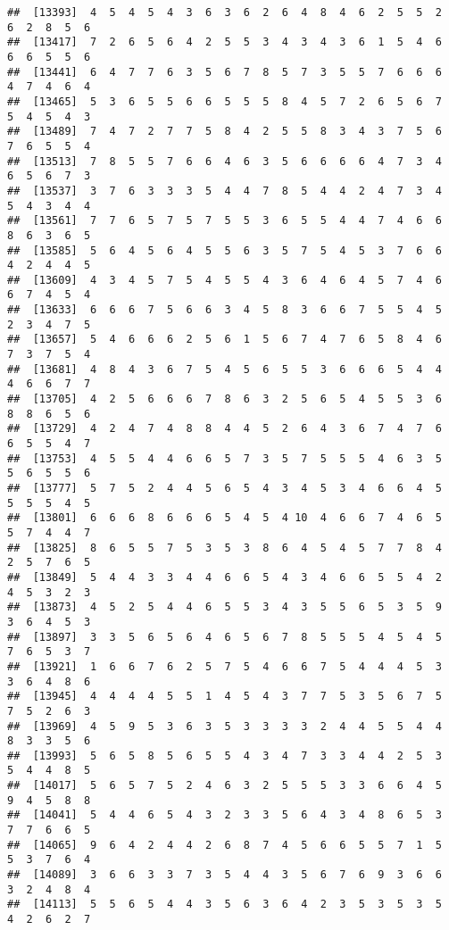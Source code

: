 \documentclass[
]{book}
\begin{document}
\begin{verbatim}
##  [13393]  4  5  4  5  4  3  6  3  6  2  6  4  8  4  6  2  5  5  2  6  2  8  5  6
##  [13417]  7  2  6  5  6  4  2  5  5  3  4  3  4  3  6  1  5  4  6  6  6  5  5  6
##  [13441]  6  4  7  7  6  3  5  6  7  8  5  7  3  5  5  7  6  6  6  4  7  4  6  4
##  [13465]  5  3  6  5  5  6  6  5  5  5  8  4  5  7  2  6  5  6  7  5  4  5  4  3
##  [13489]  7  4  7  2  7  7  5  8  4  2  5  5  8  3  4  3  7  5  6  7  6  5  5  4
##  [13513]  7  8  5  5  7  6  6  4  6  3  5  6  6  6  6  4  7  3  4  6  5  6  7  3
##  [13537]  3  7  6  3  3  3  5  4  4  7  8  5  4  4  2  4  7  3  4  5  4  3  4  4
##  [13561]  7  7  6  5  7  5  7  5  5  3  6  5  5  4  4  7  4  6  6  8  6  3  6  5
##  [13585]  5  6  4  5  6  4  5  5  6  3  5  7  5  4  5  3  7  6  6  4  2  4  4  5
##  [13609]  4  3  4  5  7  5  4  5  5  4  3  6  4  6  4  5  7  4  6  6  7  4  5  4
##  [13633]  6  6  6  7  5  6  6  3  4  5  8  3  6  6  7  5  5  4  5  2  3  4  7  5
##  [13657]  5  4  6  6  6  2  5  6  1  5  6  7  4  7  6  5  8  4  6  7  3  7  5  4
##  [13681]  4  8  4  3  6  7  5  4  5  6  5  5  3  6  6  6  5  4  4  4  6  6  7  7
##  [13705]  4  2  5  6  6  6  7  8  6  3  2  5  6  5  4  5  5  3  6  8  8  6  5  6
##  [13729]  4  2  4  7  4  8  8  4  4  5  2  6  4  3  6  7  4  7  6  6  5  5  4  7
##  [13753]  4  5  5  4  4  6  6  5  7  3  5  7  5  5  5  4  6  3  5  5  6  5  5  6
##  [13777]  5  7  5  2  4  4  5  6  5  4  3  4  5  3  4  6  6  4  5  5  5  5  4  5
##  [13801]  6  6  6  8  6  6  6  5  4  5  4 10  4  6  6  7  4  6  5  5  7  4  4  7
##  [13825]  8  6  5  5  7  5  3  5  3  8  6  4  5  4  5  7  7  8  4  2  5  7  6  5
##  [13849]  5  4  4  3  3  4  4  6  6  5  4  3  4  6  6  5  5  4  2  4  5  3  2  3
##  [13873]  4  5  2  5  4  4  6  5  5  3  4  3  5  5  6  5  3  5  9  3  6  4  5  3
##  [13897]  3  3  5  6  5  6  4  6  5  6  7  8  5  5  5  4  5  4  5  7  6  5  3  7
##  [13921]  1  6  6  7  6  2  5  7  5  4  6  6  7  5  4  4  4  5  3  3  6  4  8  6
##  [13945]  4  4  4  4  5  5  1  4  5  4  3  7  7  5  3  5  6  7  5  7  5  2  6  3
##  [13969]  4  5  9  5  3  6  3  5  3  3  3  3  2  4  4  5  5  4  4  8  3  3  5  6
##  [13993]  5  6  5  8  5  6  5  5  4  3  4  7  3  3  4  4  2  5  3  5  4  4  8  5
##  [14017]  5  6  5  7  5  2  4  6  3  2  5  5  5  3  3  6  6  4  5  9  4  5  8  8
##  [14041]  5  4  4  6  5  4  3  2  3  3  5  6  4  3  4  8  6  5  3  7  7  6  6  5
##  [14065]  9  6  4  2  4  4  2  6  8  7  4  5  6  6  5  5  7  1  5  5  3  7  6  4
##  [14089]  3  6  6  3  3  7  3  5  4  4  3  5  6  7  6  9  3  6  6  3  2  4  8  4
##  [14113]  5  5  6  5  4  4  3  5  6  3  6  4  2  3  5  3  5  3  5  4  2  6  2  7

\end{verbatim}
\end{document}
